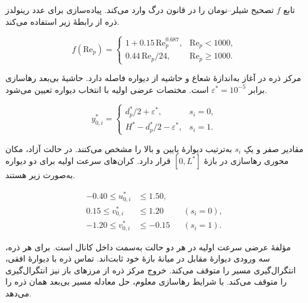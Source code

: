 تابع $f$ تصحیح شیلر–نومان را در قانون درگ وارد می‌کند.
پیاده‌سازی برای عدد رینولدز ذره از رابطهٔ زیر استفاده می‌کند.

\begin{equation}
f(\mathrm{Re}_p)=
\begin{cases}
1+0.15\,\mathrm{Re}_p^{0.687}, & \mathrm{Re}_p<1000,\\
0.44\,\mathrm{Re}_p/24, & \mathrm{Re}_p\ge 1000.
\end{cases}
\label{eq:formation-drag-factor}
\end{equation}

مرکز ذره در آغاز به‌اندازهٔ شعاع و حاشیه از دیواره فاصله دارد.
حاشیهٔ بی‌بعد رهاسازی برابر $\varepsilon^*=10^{-5}$ است.
مختصات عرضی اولیه با انتخاب دیواره تعیین می‌شود.

\begin{equation}
y_{0,i}^*=
\begin{cases}
d_p^*/2+\varepsilon^*, & s_i=0,\\
H^*-d_p^*/2-\varepsilon^*, & s_i=1.
\end{cases}
\label{eq:formation-release-height}
\end{equation}

مقادیر صفر و یکِ $s_i$ به‌ترتیب دیوارهٔ پایین و بالا را مشخص می‌کنند.
در حالت آزاد، مکان محوری رهاسازی در بازهٔ $[0,L^*]$ قرار دارد.
کران‌های سرعت اولیه برای دو دیواره به‌صورت زیر هستند.

\begin{equation}
\begin{aligned}
-0.40 \le u_{0,i}^* &\le 1.50,\\
0.15 \le v_{0,i}^* &\le 1.20 && (s_i=0),\\
-1.20 \le v_{0,i}^* &\le -0.15 && (s_i=1).
\end{aligned}
\label{eq:formation-release-velocity-bounds}
\end{equation}

مؤلفهٔ عرضی سرعت اولیه در هر دو حالت به‌سمت داخل کانال است.
برای هر ذره، سه ورودی دیوارهٔ مقابل در میانهٔ بازهٔ خود ثابت‌اند.
تماس ذره با دیوارهٔ افقی، انتگرال‌گیری مسیر را متوقف می‌کند.
خروج مرکز ذره از مرزهای باز نیز انتگرال‌گیری را متوقف می‌کند.
با شرایط رهاسازی معلوم، حل معادله مسیر بی‌بعد همان ذره را می‌دهد.

\label{sec:formation-objective}


